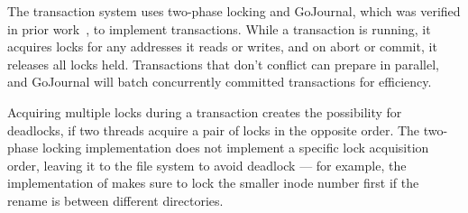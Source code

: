 
The transaction system uses two-phase locking and GoJournal, which was
verified in prior work~\cite{chajed:gojournal}, to implement
transactions.  While a transaction is running, it acquires locks for
any addresses it reads or writes, and on abort or commit, it releases
all locks held. Transactions that don't conflict can prepare in
parallel, and GoJournal will batch concurrently committed
transactions for efficiency.

Acquiring multiple locks during a transaction creates the possibility
for deadlocks, if two threads acquire a pair of locks in the opposite
order. The two-phase locking implementation does not implement a
specific lock acquisition order, leaving it to the file system to
avoid deadlock --- for example, the implementation of 
makes sure to lock the smaller inode number first if the rename is
between different directories.

